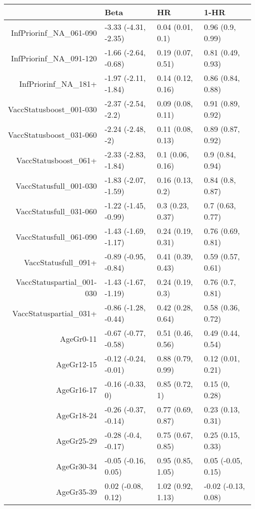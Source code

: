 \begin{table}[ht]
\centering
\begin{tabular}{rlll}
  \hline
 & Beta & HR & 1-HR \\ 
  \hline
InfPriorinf\_NA\_061-090 & -3.33 (-4.31, -2.35) & 0.04 (0.01, 0.1) & 0.96 (0.9, 0.99) \\ 
  InfPriorinf\_NA\_091-120 & -1.66 (-2.64, -0.68) & 0.19 (0.07, 0.51) & 0.81 (0.49, 0.93) \\ 
  InfPriorinf\_NA\_181+ & -1.97 (-2.11, -1.84) & 0.14 (0.12, 0.16) & 0.86 (0.84, 0.88) \\ 
  VaccStatusboost\_001-030 & -2.37 (-2.54, -2.2) & 0.09 (0.08, 0.11) & 0.91 (0.89, 0.92) \\ 
  VaccStatusboost\_031-060 & -2.24 (-2.48, -2) & 0.11 (0.08, 0.13) & 0.89 (0.87, 0.92) \\ 
  VaccStatusboost\_061+ & -2.33 (-2.83, -1.84) & 0.1 (0.06, 0.16) & 0.9 (0.84, 0.94) \\ 
  VaccStatusfull\_001-030 & -1.83 (-2.07, -1.59) & 0.16 (0.13, 0.2) & 0.84 (0.8, 0.87) \\ 
  VaccStatusfull\_031-060 & -1.22 (-1.45, -0.99) & 0.3 (0.23, 0.37) & 0.7 (0.63, 0.77) \\ 
  VaccStatusfull\_061-090 & -1.43 (-1.69, -1.17) & 0.24 (0.19, 0.31) & 0.76 (0.69, 0.81) \\ 
  VaccStatusfull\_091+ & -0.89 (-0.95, -0.84) & 0.41 (0.39, 0.43) & 0.59 (0.57, 0.61) \\ 
  VaccStatuspartial\_001-030 & -1.43 (-1.67, -1.19) & 0.24 (0.19, 0.3) & 0.76 (0.7, 0.81) \\ 
  VaccStatuspartial\_031+ & -0.86 (-1.28, -0.44) & 0.42 (0.28, 0.64) & 0.58 (0.36, 0.72) \\ 
  AgeGr0-11 & -0.67 (-0.77, -0.58) & 0.51 (0.46, 0.56) & 0.49 (0.44, 0.54) \\ 
  AgeGr12-15 & -0.12 (-0.24, -0.01) & 0.88 (0.79, 0.99) & 0.12 (0.01, 0.21) \\ 
  AgeGr16-17 & -0.16 (-0.33, 0) & 0.85 (0.72, 1) & 0.15 (0, 0.28) \\ 
  AgeGr18-24 & -0.26 (-0.37, -0.14) & 0.77 (0.69, 0.87) & 0.23 (0.13, 0.31) \\ 
  AgeGr25-29 & -0.28 (-0.4, -0.17) & 0.75 (0.67, 0.85) & 0.25 (0.15, 0.33) \\ 
  AgeGr30-34 & -0.05 (-0.16, 0.05) & 0.95 (0.85, 1.05) & 0.05 (-0.05, 0.15) \\ 
  AgeGr35-39 & 0.02 (-0.08, 0.12) & 1.02 (0.92, 1.13) & -0.02 (-0.13, 0.08) \\ 

\end{tabular}
\end{table}
